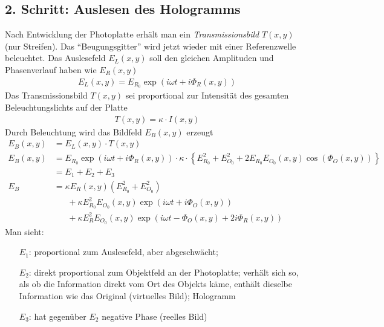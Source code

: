 \subsection*{2. Schritt: Auslesen des Hologramms}
  Nach Entwicklung der Photoplatte erhält man ein
  \emph{Transmissionsbild} $T(x,y)$%
  (nur Streifen).
  Das \enquote{Beugungsgitter} wird jetzt wieder mit einer Referenzwelle
  beleuchtet.
  Das Auslesefeld $E_L(x,y)$%
  soll den gleichen Amplituden und Phasenverlauf haben wie $E_R(x,y)$
  \begin{gather*}
    E_L(x,y) = E_{R_0}\exp(i\omega t + i\Phi_R(x,y))
  \end{gather*}
  Das Transmissionsbild $T(x,y)$ sei proportional zur Intensität des
  gesamten Beleuchtungslichts auf der Platte
  \begin{gather*}
    T(x,y) = \kappa \cdot I(x,y)
  \end{gather*}
  Durch Beleuchtung wird das Bildfeld $E_B(x,y)$ 
  erzeugt
  \begin{align*}
    E_B(x,y) &= E_L(x,y) \cdot T(x,y)\\
    E_B(x,y) &= E_{R_0}\exp(i\omega t + i\Phi_R(x,y))\cdot \kappa 
               \cdot\left\{E_{R_0}^2 + E_{O_0}^2 +
               2E_{R_0}E_{O_0}(x,y)\cos(\Phi_O(x,y))\right\}\\
             &= E_1 + E_2 + E_3\\
    E_B &= \kappa E_R(x,y) \left( E_{R_0}^2 + E_{O_0}^2 \right)\\
             &\phantom{=}\; + 
               \kappa E_{R_0}^2 E_{O_0}(x,y)\exp(i\omega t + i\Phi_O(x,y))\\
             &\phantom{=}\; + 
               \kappa E_{R}^2 E_{O_0}(x,y)\exp(i\omega t-\Phi_O(x,y)+2i\Phi_R(x,y))
  \end{align*}
  Man sieht:
  \begin{itemize}
  \item[$E_1$:] proportional zum Auslesefeld, aber abgeschwächt;
  \item[$E_2$:] direkt proportional zum Objektfeld an der Photoplatte;
    verhält sich so, als ob die Information direkt vom Ort des Objekts
    käme, enthält dieselbe Information wie das Original (virtuelles
    Bild); Hologramm
  \item[$E_3$:] hat gegenüber $E_2$ negative Phase (reelles Bild)
  \end{itemize}


